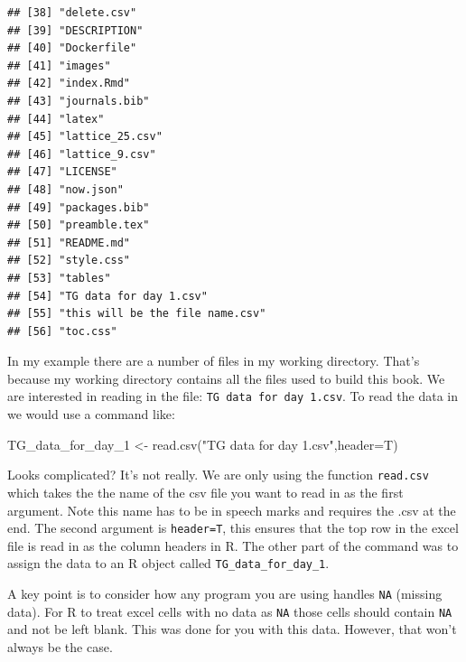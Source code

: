 \documentclass[
]{book}
\newenvironment{Shaded}{\begin{snugshade}}{\end{snugshade}}
\newcommand{\AttributeTok}[1]{\textcolor[rgb]{0.77,0.63,0.00}{#1}}
\newcommand{\FunctionTok}[1]{\textcolor[rgb]{0.00,0.00,0.00}{#1}}
\newcommand{\NormalTok}[1]{#1}
\newcommand{\OtherTok}[1]{\textcolor[rgb]{0.56,0.35,0.01}{#1}}
\newcommand{\StringTok}[1]{\textcolor[rgb]{0.31,0.60,0.02}{#1}}
\begin{document}
\begin{verbatim}
## [38] "delete.csv"                                         
## [39] "DESCRIPTION"                                        
## [40] "Dockerfile"                                         
## [41] "images"                                             
## [42] "index.Rmd"                                          
## [43] "journals.bib"                                       
## [44] "latex"                                              
## [45] "lattice_25.csv"                                     
## [46] "lattice_9.csv"                                      
## [47] "LICENSE"                                            
## [48] "now.json"                                           
## [49] "packages.bib"                                       
## [50] "preamble.tex"                                       
## [51] "README.md"                                          
## [52] "style.css"                                          
## [53] "tables"                                             
## [54] "TG data for day 1.csv"                              
## [55] "this will be the file name.csv"                     
## [56] "toc.css"
\end{verbatim}

In my example there are a number of files in my working directory. That's because my working directory contains all the files used to build this book. We are interested in reading in the file: \texttt{TG\ data\ for\ day\ 1.csv}. To read the data in we would use a command like:

\begin{Shaded}
\begin{Highlighting}[]
\NormalTok{TG\_data\_for\_day\_1 }\OtherTok{\textless{}{-}} \FunctionTok{read.csv}\NormalTok{(}\StringTok{"TG data for day 1.csv"}\NormalTok{,}\AttributeTok{header=}\NormalTok{T)}
\end{Highlighting}
\end{Shaded}

Looks complicated? It's not really. We are only using the function \texttt{read.csv} which takes the the name of the csv file you want to read in as the first argument. Note this name has to be in speech marks and requires the .csv at the end. The second argument is \texttt{header=T}, this ensures that the top row in the excel file is read in as the column headers in R. The other part of the command was to assign the data to an R object called \texttt{TG\_data\_for\_day\_1}.

A key point is to consider how any program you are using handles \texttt{NA} (missing data). For R to treat excel cells with no data as \texttt{NA} those cells should contain \texttt{NA} and not be left blank. This was done for you with this data. However, that won't always be the case.
\end{document}
